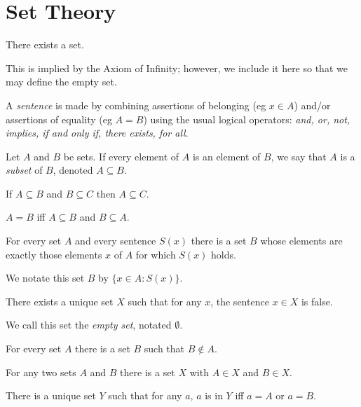 \chapter{Set Theory}
\begin{axiom}[Existence]
  There exists a set.
\end{axiom}
\begin{rem}
  This is implied by the Axiom of Infinity; however, we include it here so that
  we may define the empty set.
\end{rem}
\begin{defn}
  A \emph{sentence} is made by combining assertions of belonging (eg $x\in A$)
  and/or assertions of equality (eg $A=B$) using the usual logical operators:
  \emph{and, or, not, implies, if and only if, there exists, for all}.
\end{defn}
\begin{defn}
  Let $A$ and $B$ be sets.
  If every element of $A$ is an element of $B$, we say that $A$ is a
  \emph{subset} of $B$, denoted $A\subseteq B$.
\end{defn}
\begin{prop}
  If $A\subseteq B$ and $B\subseteq C$ then $A\subseteq C$.
\end{prop}
\begin{axiom}[Extensionality]
  $A=B$ iff $A\subseteq B$ and $B\subseteq A$.
\end{axiom}
\begin{axiom}[Specification]
  For every set $A$ and every sentence $S(x)$ there is a set $B$ whose elements
  are exactly those elements $x$ of $A$ for which $S(x)$ holds.
\end{axiom}
\begin{defn}
  We notate this set $B$ by $\{x\in A: S(x)\}$.
\end{defn}
\begin{prop}
  There exists a unique set $X$ such that for any $x$, the sentence
  $x\in X$ is false.
\end{prop}
\begin{defn}
  We call this set the \emph{empty set}, notated $\emptyset$.
\end{defn}
\begin{prop}
  For every set $A$ there is a set $B$ such that $B\not\in A$.
\end{prop}
\begin{axiom}[Pairing]
  For any two sets $A$ and $B$ there is a set $X$ with $A\in X$ and $B\in X$.
\end{axiom}
\begin{prop}
  There is a unique set $Y$ such that for any $a$, $a$ is in $Y$ iff $a=A$ or $a=B$.
\end{prop}
